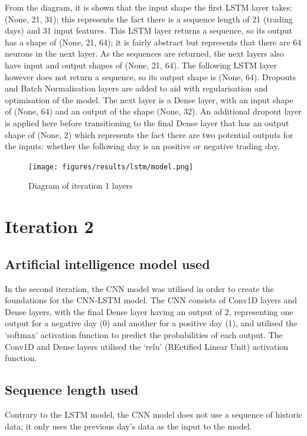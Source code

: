 From the diagram, it is shown that the input shape the first LSTM layer takes: (None, 21, 31); this represents the
fact there is a sequence length of 21 (trading days) and 31 input features.  This LSTM layer returns a sequence, so its
output has a shape of (None, 21, 64); it is fairly abstract but represents that there are 64 neurons in the next layer.
As the sequences are returned, the next layers also have input and output shapes of (None, 21, 64). The following LSTM
layer however does not return a sequence, so its output shape is (None, 64).
Dropouts and Batch Normalisation layers are added to aid with regularisation and optimisation of the model.
The next layer is a Dense layer, with an input shape of (None, 64) and an output of the shape (None, 32). An additional
dropout layer is applied here before transitioning to the final Dense layer that has an output shape of (None, 2)
which represents the fact there are two potential outputs for the inputs: whether the following day
is an positive or negative trading day.

\begin{figure}[ht]
    \centering
    \texttt{[image: figures/results/lstm/model.png]}
    \caption[Diagram of iteration 1 layers]{Diagram of iteration 1 layers}
    \label{fig:iteration1_model}
\end{figure}
\FloatBarrier

\section{Iteration 2}
\subsection{Artificial intelligence model used}\label{ssec:iteration2_ai_model}
In the second iteration, the CNN model was utilised in order to create the foundations for the CNN-LSTM model. The CNN
consists of Conv1D layers and Dense layers, with the final Dense layer having an output of 2, representing one output for
a negative day (0) and another for a positive day (1), and utilised the `softmax' activation function to predict the
probabilities of each output. The Conv1D and Dense layers utilised the `relu' (REctified Linear Unit) activation
function.

\subsection{Sequence length used}
Contrary to the LSTM model, the CNN model does not use a sequence of historic data; it only uses the previous day's
data as the input to the model.

